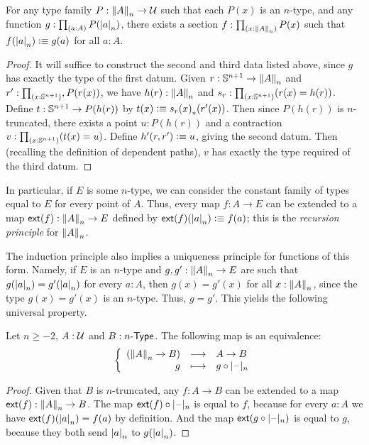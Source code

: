 \begin{thm}\label{thm:truncn-ind}
  For any type family $P:\trunc n A \to \type$ such that each $P(x)$ is an $n$-type, and any function $g : \prd{a:A} P(\tproj n a)$, there
exists a section $f:\prd{x:\trunc n A} P(x)$ such that $f(\tproj n a)\defeq g(a)$ for all $a:A$.
\end{thm}
\begin{proof}
  It will suffice to construct the second and third data listed above, since $g$ has exactly the type of the first datum.
  Given $r:\Sn^{n+1} \to \trunc n A$ and $r':\prd{x:\Sn^{n+1}}, P(r(x))$, we have $h(r):\trunc n A$ and $s_r :\prd{x:\Sn^{n+1}} (r(x) =
h(r))$.
  Define $t:\Sn^{n+1} \to P(h(r))$ by $t(x) \defeq \trans{s_r(x)}{r'(x)}$.
  Then since $P(h(r))$ is $n$-truncated, there exists a point $u:P(h(r))$ and a contraction $v:\prd{x:\Sn^{n+1}} (t(x) = u)$.
  Define $h'(r,r') \defeq u$, giving the second datum.
  Then (recalling the definition of dependent paths), $v$ has exactly the type required of the third datum.
\end{proof}

In particular, if $E$ is some $n$-type, we can consider the constant family of types equal to $E$ for every point of $A$.
Thus, every map $f:A\to{}E$ can be extended to a map $\extend{f}:\trunc nA\to{}E$ defined by $\extend{f}(\tproj na)\defeq f(a)$; this is the \emph{recursion principle} for $\trunc n A$.

The induction principle also implies a uniqueness principle for functions of this form.
Namely, if $E$ is an $n$-type and $g,g':\trunc nA\to{}E$ are such
that $g(\tproj na)=g'(\tproj na)$ for every $a:A$, then $g(x)=g'(x)$ for all $x:\trunc nA$, since the type $g(x)=g'(x)$ is an $n$-type.
Thus, $g=g'$.
This yields the following universal property.

\begin{lem}\label{thm:trunc-reflective}
  Let $n\ge-2$, $A:\type$ and $B:\typele{n}$. The following map is an
  equivalence:
  \[\function{(\trunc nA\to{}B)}{A\to{}B}{g}{g\circ\tprojf n}\]
\end{lem}

\begin{proof}
  Given that $B$ is $n$-truncated, any $f:A\to{}B$ can be extended to a map $\extend{f}:\trunc nA\to{}B$.
  The map $\extend{f}\circ\tprojf n$ is equal to $f$, because for every $a:A$ we have $\extend{f}(\tproj na)=f(a)$ by definition.
  And the map $\extend{g\circ\tprojf n}$ is equal to $g$, because they both send $\tproj na$ to $g(\tproj na)$.
\end{proof}

